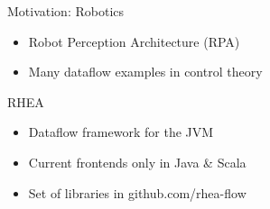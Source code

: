 \documentclass{beamer}
\renewcommand\alert[1]{\textcolor{mLightBrown}{#1}}
\begin{document}
	\begin{frame}{Motivation: Robotics}
		\begin{itemize}
		\item Robot Perception Architecture (RPA)
		\item Many dataflow examples in control theory
		\end{itemize}
	\end{frame}
	
	\begin{frame}{RHEA}
	  \begin{itemize}
	  \item Dataflow framework for the JVM
	  \item Current frontends only in Java \& Scala
	  \item Set of libraries in \alert{github.com/rhea-flow}
	  \end{itemize}
	\end{frame}
	
\end{document}
